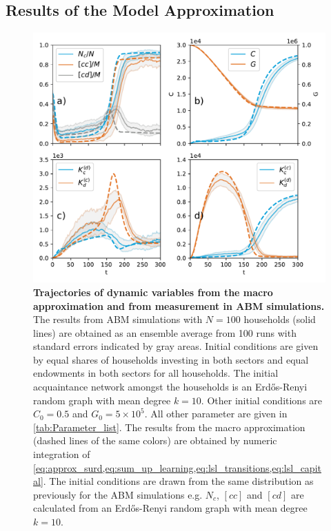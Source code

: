 \subsection{Results of the Model Approximation}

\begin{figure}[ht!]
  \hspace{-.1cm}\centering\includegraphics[width=1.1\linewidth]{figures/micro_vs_approx_v2.pdf}
  \caption{\textbf{Trajectories of dynamic variables from the macro approximation and from measurement in ABM simulations.} The results from ABM simulations with $N=100$ households (solid lines) are obtained as an ensemble average from 100 runs with standard errors indicated by gray areas. Initial conditions are given by equal shares of households investing in both sectors and equal endowments in both sectors for all households. The initial acquaintance network amongst the households is an Erd\H{o}s-Renyi random graph with mean degree $k=10$. Other initial conditions are $C_0=0.5$ and $G_0=5 \times 10^5$. All other parameter are given in \cref{tab:Parameter_list}. The results from the macro approximation (dashed lines of the same colors) are obtained by numeric integration of \cref{eq:approx_surd,eq:sum_up_learning,eq:lsl_transitions,eq:lsl_capital}. The initial conditions are drawn from the same distribution as previously for the ABM simulations e.g. $N_c$, $[cc]$ and $[cd]$ are calculated from an Erd\H{o}s-Renyi random graph with mean degree $k=10$.}
\label{fig:comparison2}
\end{figure}
